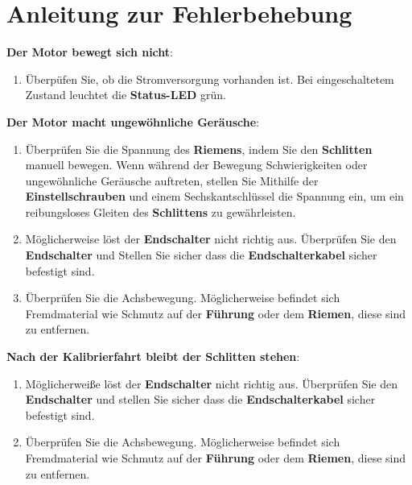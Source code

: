 %
%

\chapter{Anleitung zur Fehlerbehebung}


	
		\item \textbf{Der Motor bewegt sich nicht}:\begin{enumerate} \item Überpüfen Sie, ob die Stromversorgung vorhanden ist. Bei eingeschaltetem Zustand leuchtet die \textbf{Status-LED} grün.
	\end{enumerate}
	
	\item \textbf{Der Motor macht ungewöhnliche Geräusche}:\begin{enumerate} 

			\item Überprüfen Sie die Spannung des \textbf{Riemens}, indem Sie den \textbf{Schlitten} manuell bewegen. Wenn während der Bewegung Schwierigkeiten oder ungewöhnliche Geräusche auftreten, stellen Sie Mithilfe der \textbf{Einstellschrauben} und einem Sechskantschlüssel die Spannung ein, um ein reibungsloses Gleiten des \textbf{Schlittens} zu gewährleisten.

				\item Möglicherweise löst der \textbf{Endschalter} nicht richtig aus. Überprüfen Sie den \textbf{Endschalter} und Stellen Sie sicher dass die \textbf{Endschalterkabel} sicher befestigt sind.
				
						\item Überprüfen Sie die Achsbewegung. Möglicherweise befindet sich Fremdmaterial wie Schmutz auf der \textbf{Führung} oder dem \textbf{Riemen}, diese sind zu entfernen. 
\end{enumerate}

	\item \textbf{Nach der Kalibrierfahrt bleibt der Schlitten stehen}:\begin{enumerate} \item Möglicherweiße löst der \textbf{Endschalter} nicht richtig aus. Überprüfen Sie den \textbf{Endschalter} und stellen Sie sicher dass die \textbf{Endschalterkabel} sicher befestigt sind.
			\item Überprüfen Sie die Achsbewegung. Möglicherweise befindet sich Fremdmaterial wie Schmutz auf der \textbf{Führung} oder dem \textbf{Riemen}, diese sind zu entfernen. 
	\end{enumerate}